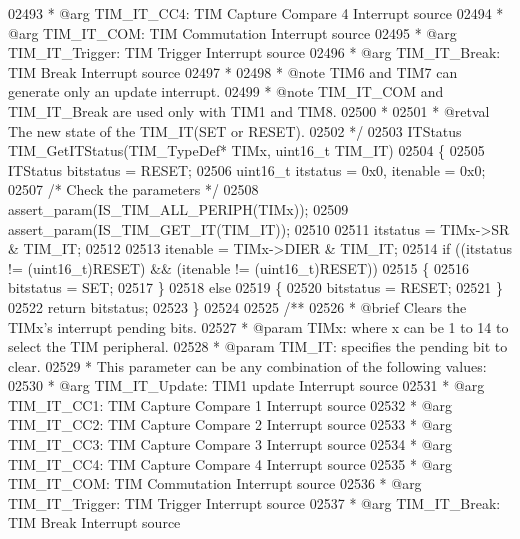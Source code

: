 \begin{DoxyCode}
02493 \textcolor{comment}{  *            @arg TIM\_IT\_CC4: TIM Capture Compare 4 Interrupt source}
02494 \textcolor{comment}{  *            @arg TIM\_IT\_COM: TIM Commutation Interrupt source}
02495 \textcolor{comment}{  *            @arg TIM\_IT\_Trigger: TIM Trigger Interrupt source}
02496 \textcolor{comment}{  *            @arg TIM\_IT\_Break: TIM Break Interrupt source}
02497 \textcolor{comment}{  *}
02498 \textcolor{comment}{  * @note   TIM6 and TIM7 can generate only an update interrupt.}
02499 \textcolor{comment}{  * @note   TIM\_IT\_COM and TIM\_IT\_Break are used only with TIM1 and TIM8.}
02500 \textcolor{comment}{  *     }
02501 \textcolor{comment}{  * @retval The new state of the TIM\_IT(SET or RESET).}
02502 \textcolor{comment}{  */}
02503 ITStatus TIM_GetITStatus(TIM\_TypeDef* TIMx, uint16\_t TIM\_IT)
02504 \{
02505   ITStatus bitstatus = RESET;
02506   uint16\_t itstatus = 0x0, itenable = 0x0;
02507   \textcolor{comment}{/* Check the parameters */}
02508   assert_param(IS\_TIM\_ALL\_PERIPH(TIMx));
02509   assert_param(IS\_TIM\_GET\_IT(TIM\_IT));
02510 
02511   itstatus = TIMx->SR & TIM\_IT;
02512 
02513   itenable = TIMx->DIER & TIM\_IT;
02514   \textcolor{keywordflow}{if} ((itstatus != (uint16\_t)RESET) && (itenable != (uint16\_t)RESET))
02515   \{
02516     bitstatus = SET;
02517   \}
02518   \textcolor{keywordflow}{else}
02519   \{
02520     bitstatus = RESET;
02521   \}
02522   \textcolor{keywordflow}{return} bitstatus;
02523 \}
02524 
02525 \textcolor{comment}{/**}
02526 \textcolor{comment}{  * @brief  Clears the TIMx's interrupt pending bits.}
02527 \textcolor{comment}{  * @param  TIMx: where x can be 1 to 14 to select the TIM peripheral.}
02528 \textcolor{comment}{  * @param  TIM\_IT: specifies the pending bit to clear.}
02529 \textcolor{comment}{  *          This parameter can be any combination of the following values:}
02530 \textcolor{comment}{  *            @arg TIM\_IT\_Update: TIM1 update Interrupt source}
02531 \textcolor{comment}{  *            @arg TIM\_IT\_CC1: TIM Capture Compare 1 Interrupt source}
02532 \textcolor{comment}{  *            @arg TIM\_IT\_CC2: TIM Capture Compare 2 Interrupt source}
02533 \textcolor{comment}{  *            @arg TIM\_IT\_CC3: TIM Capture Compare 3 Interrupt source}
02534 \textcolor{comment}{  *            @arg TIM\_IT\_CC4: TIM Capture Compare 4 Interrupt source}
02535 \textcolor{comment}{  *            @arg TIM\_IT\_COM: TIM Commutation Interrupt source}
02536 \textcolor{comment}{  *            @arg TIM\_IT\_Trigger: TIM Trigger Interrupt source}
02537 \textcolor{comment}{  *            @arg TIM\_IT\_Break: TIM Break Interrupt source}

\end{DoxyCode}
